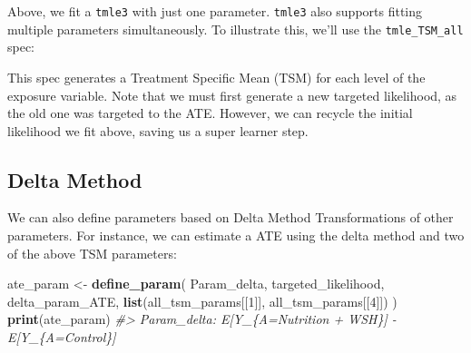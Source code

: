 \documentclass[12pt, krantz2,]{book}
\newenvironment{Shaded}{\begin{snugshade}}{\end{snugshade}}
\newcommand{\CommentTok}[1]{\textcolor[rgb]{0.56,0.35,0.01}{\textit{#1}}}
\newcommand{\DecValTok}[1]{\textcolor[rgb]{0.00,0.00,0.81}{#1}}
\newcommand{\KeywordTok}[1]{\textcolor[rgb]{0.13,0.29,0.53}{\textbf{#1}}}
\newcommand{\NormalTok}[1]{#1}
\newcommand{\OperatorTok}[1]{\textcolor[rgb]{0.81,0.36,0.00}{\textbf{#1}}}
\newcommand{\StringTok}[1]{\textcolor[rgb]{0.31,0.60,0.02}{#1}}
\theoremstyle{definition}
\theoremstyle{definition}
\theoremstyle{definition}
\newcommand{\1}{\mathbbm{1}}
\begin{document}
Above, we fit a \texttt{tmle3} with just one parameter. \texttt{tmle3} also supports fitting
multiple parameters simultaneously. To illustrate this, we'll use the
\texttt{tmle\_TSM\_all} spec:

\begin{Shaded}
\end{Shaded}

This spec generates a Treatment Specific Mean (TSM) for each level of the
exposure variable. Note that we must first generate a new targeted likelihood,
as the old one was targeted to the ATE. However, we can recycle the initial
likelihood we fit above, saving us a super learner step.

\hypertarget{delta-method}{%
\subsection{Delta Method}\label{delta-method}}

We can also define parameters based on Delta Method Transformations of other
parameters. For instance, we can estimate a ATE using the delta method and two
of the above TSM parameters:

\begin{Shaded}
\begin{Highlighting}[]
\NormalTok{ate_param <-}\StringTok{ }\KeywordTok{define_param}\NormalTok{(}
\NormalTok{  Param_delta, targeted_likelihood,}
\NormalTok{  delta_param_ATE,}
  \KeywordTok{list}\NormalTok{(all_tsm_params[[}\DecValTok{1}\NormalTok{]], all_tsm_params[[}\DecValTok{4}\NormalTok{]])}
\NormalTok{)}
\KeywordTok{print}\NormalTok{(ate_param)}
\CommentTok{#> Param_delta: E[Y_\{A=Nutrition + WSH\}] - E[Y_\{A=Control\}]}
\end{Highlighting}
\end{Shaded}
\end{document}
